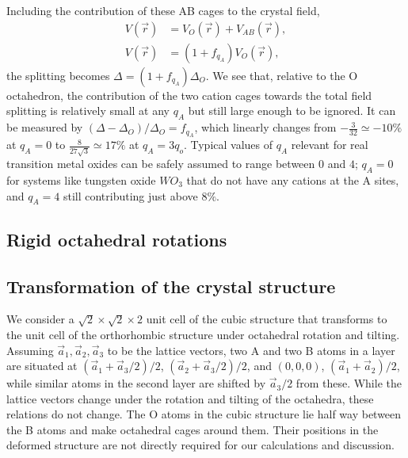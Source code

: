 \documentclass[a4paper,prb,twocolumn]{revtex4-1}  %
\newcommand{\com}[1]{}
\newcommand{\az}[1]{{\color{magenta}{#1}}} %
\begin{document}
Including the contribution of these AB cages to the crystal field,
\begin{align}
V(\vec r) &= V_{O}(\vec r) + V_{AB}(\vec r),\\
V(\vec r)  &= (1+f_{q_A}) V_{O}(\vec r),
\end{align}
the 
 splitting becomes
$\Delta = (1+f_{q_A})\Delta_O$.
We see that, relative to the O octahedron,
 the contribution of the
 two cation cages towards the total field splitting
 is relatively small at any $q_A$ but
 still large enough to be ignored.
It can be measured by $(\Delta-\Delta_O)/\Delta_O=f_{q_A}$,
which linearly changes from 
$-\frac{3}{32}\simeq -10\%$ at $q_A=0$
to $\frac{8}{27 \sqrt{3}}\simeq 17\%$ at $q_A=3q_o$. 
Typical values of $q_A$ relevant for real transition metal oxides
can be safely assumed to range between $0$ and $4$;  
$q_A=0$ for systems like tungsten oxide $WO_3$ that do not have any cations at the A sites,
and $q_A=4$ still contributing just above $8\%$. 
\az{Not just this pot, deformation induces $l=2$ V2m that can couple much more strongly.... bcs of larger D222. 
}







\subsection{Rigid octahedral rotations}
\label{sec:rotation}



\subsection{Transformation of the crystal structure}
\label{sec:structure}

\com{
Coordinates of the Oxygen atoms transform according to 
the rotation matrix $R$.
While the d-orbitals basis states attached to the octahedron transform according to
$\mathcal{R}$.
}
\az{figure vesta structure, label octahedra 1-4.}


We consider a
$\sqrt{2}\times\sqrt{2}\times 2$ unit cell of the cubic structure that transforms
to the unit cell of the orthorhombic structure under octahedral rotation and tilting.
Assuming $\vec a_1,\vec a_2,\vec a_3$ to be the lattice vectors,
two A and two B atoms in a layer are situated at
$(\vec a_1 + \vec a_3/2)/2$, $(\vec a_2+ \vec a_3/2)/2$,
and $(0,0,0)$, $(\vec a_1 + \vec a_2)/2$, 
while similar atoms in the second layer are shifted by $\vec a_3/2$ from these.
While the lattice vectors change under the rotation and tilting of the octahedra, 
these relations do not change.
The O atoms in the cubic structure lie half way between the B atoms and make octahedral cages around them.
Their positions in the deformed structure %
are not directly required for our calculations and discussion.
\end{document}
